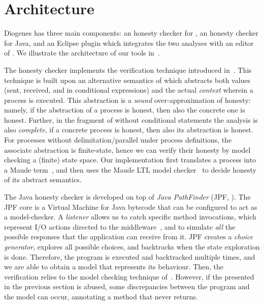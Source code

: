 \section{Architecture}

Diogenes has three main components:
an honesty checker for \coco,
an honesty checker for Java,
and an Eclipse plugin which integrates the two analyses
with an editor of \coco.
We illustrate the architecture of our tools in~.

The \coco honesty checker implements the  
verification technique introduced in~\cite{BMSZ15jlamp}.
This technique is built upon an alternative semantics of \coco 
which abstracts both values (sent, received, and in conditional expressions) 
and the actual \emph{context} wherein a process is executed.
This abstraction is a \emph{sound} over-approximation of honesty:
namely, if the abstraction of a process is honest,
then also the concrete one is honest.
Further, in the fragment of \coco without conditional statements
the analysis is also \emph{complete},
\ie if a concrete process is honest, then also its abstraction is honest.
For processes without delimitation/parallel under process definitions,
the associate abstraction is finite-state, 
hence we can verify their honesty by model checking a (finite) state space.
Our implementation 
first translates a \coco process into a Maude term~\cite{Maude01}, 
and then uses the Maude LTL model checker~\cite{Eker02maude}
to decide honesty of its abstract semantics.

The Java honesty checker is developed on top of \emph{Java PathFinder}
(JPF, \cite{lerda2001addressing,visser2003model}).
The JPF core is a Virtual Machine for Java bytecode
that can be configured to act as a model-checker.
%
A \emph{listener} allows us to catch specific method invocations, 
which represent I/O actions
directed to the middleware~\cite{CO2middleware},
and to simulate \emph{all} the possible responses that 
the application can receive from it.
%
JPF creates a \emph{choice generator}, explores all possible choices,
and backtracks when the state exploration is done.
%
Therefore, the program is executed and backtracked multiple times,
and we are able to obtain a \coco model that represents its behaviour.
Then, the verification relies to the model checking technique of~\cite{BMSZ15jlamp}.
%
However, if the  presented in the previous section
is abused, some discrepancies between the program and the model
can occur, \eg annotating a method that never returns.

